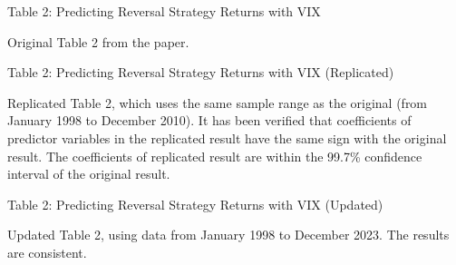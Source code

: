 \documentclass{article}
\newcommand*{\PathToOutput}{../output/}
\begin{document}
\begin{landscape}
\begin{table}
    \centering
    \caption*{Table 2: Predicting Reversal Strategy Returns with VIX}
    
    \small Original Table 2 from the paper.
    \medskip

    
\end{table}


\begin{table}
    \centering
    \caption*{Table 2: Predicting Reversal Strategy Returns with VIX (Replicated)}

    \raggedright
    \small Replicated Table 2, which uses the same sample range as the original (from 
    January 1998 to December 2010). 
    It has been verified that coefficients of predictor variables in the replicated result
    have the same sign with the original result. The coefficients of replicated result are
    within the 99.7\% confidence interval of the original result.
    \medskip

    \centering
    
\end{table}

\begin{table}
    \centering
    \caption*{Table 2: Predicting Reversal Strategy Returns with VIX (Updated)}

    \small Updated Table 2, using data from January 1998 to December 2023.
    The results are consistent.
    \medskip

    
\end{table}

\end{landscape}

\newpage


\end{document}
